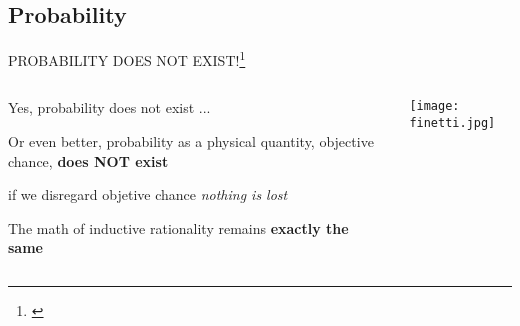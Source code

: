 \subsection{Probability}
\begin{frame}{PROBABILITY DOES NOT EXIST!\footnote{\textcite{definettiTheoryProbability1974}}}
	\begin{columns}
		\begin{column}{0.8\textwidth}
			\begin{vfilleditems}
				\item Yes, probability does not exist ...
				\item Or even better, probability as a physical quantity,
				objective chance, \textbf{does NOT exist}
				\item if we disregard objetive chance \textit{nothing is lost}
				\item The math of inductive rationality remains
				\textbf{exactly the same}
			\end{vfilleditems}
		\end{column}
		\begin{column}{0.2\textwidth}
			\centering
			\texttt{[image: finetti.jpg]}
		\end{column}
	\end{columns}
\end{frame}

